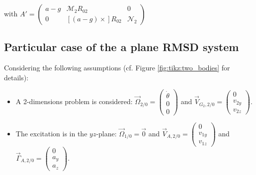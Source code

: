 \documentclass[\main/main.tex]{subfiles}
\begin{document}
with $A' = \begin{pmatrix}
  a - g & \mathcal{M}_2 R_{02} & 0\\
  0 & [(a - g) \times] R_{02} & \mathcal{N}_2
\end{pmatrix}$

\subsection{Particular case of the a plane \ac{RMSD} system}
 \label{appendix:plane-rmsd}

Considering the following assumptions (cf. Figure \ref{fig:tikz:two_bodies} for details):

\begin{itemize}

 \item A 2-dimensions problem is considered: $\overrightarrow{\Omega}_{2/0} =
       \begin{pmatrix}
        \dot{\theta} \\
        0            \\
        0
       \end{pmatrix}$ and $\overrightarrow{V}_{G_2, 2/0} =
       \begin{pmatrix}
        0      \\
        v_{2y} \\
        v_{2z}
       \end{pmatrix}$.

 \item The excitation is in the $yz$-plane: $\overrightarrow{\Omega}_{1/0} = \overrightarrow{0}$ and $\overrightarrow{V}_{A, 2/0}
       =
       \begin{pmatrix}
        0      \\
        v_{1y} \\
        v_{1z}
       \end{pmatrix}$
       and $\overrightarrow{\Gamma}_{A, 2/0}
       =
       \begin{pmatrix}
        0      \\
        a_y \\
        a_z
       \end{pmatrix}$.


\end{itemize}
\end{document}
